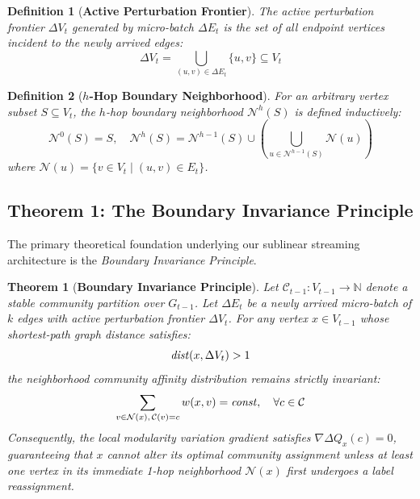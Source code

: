 \documentclass[10pt,journal,compsoc]{IEEEtran}
\newtheorem{theorem}{Theorem}
\newtheorem{definition}{Definition}
\begin{document}
\begin{definition}[\textbf{Active Perturbation Frontier}]
The active perturbation frontier $\Delta V_t$ generated by micro-batch $\Delta E_t$ is the set of all endpoint vertices incident to the newly arrived edges:
\begin{equation}
\Delta V_t = \bigcup_{(u, v) \in \Delta E_t} \{u, v\} \subseteq V_t
\end{equation}
\end{definition}

\begin{definition}[\textbf{$h$-Hop Boundary Neighborhood}]
For an arbitrary vertex subset $S \subseteq V_t$, the $h$-hop boundary neighborhood $\mathcal{N}^h(S)$ is defined inductively:
\begin{equation}
\mathcal{N}^0(S) = S, \quad \mathcal{N}^h(S) = \mathcal{N}^{h-1}(S) \cup \left( \bigcup_{u \in \mathcal{N}^{h-1}(S)} \mathcal{N}(u) \right)
\end{equation}
where $\mathcal{N}(u) = \{v \in V_t \mid (u, v) \in E_t\}$.
\end{definition}

\subsection{Theorem 1: The Boundary Invariance Principle}
The primary theoretical foundation underlying our sublinear streaming architecture is the \textit{Boundary Invariance Principle}.

\begin{theorem}[\textbf{Boundary Invariance Principle}]\label{thm:boundary_invariance}
Let $\mathcal{C}_{t-1}: V_{t-1} \to \mathbb{N}$ denote a stable community partition over $G_{t-1}$. Let $\Delta E_t$ be a newly arrived micro-batch of $k$ edges with active perturbation frontier $\Delta V_t$. For any vertex $x \in V_{t-1}$ whose shortest-path graph distance satisfies:
\begin{equation}
\text{\emph{dist}}(x, \Delta V_t) > 1
\end{equation}
the neighborhood community affinity distribution remains strictly invariant:
\begin{equation}
\sum_{v \in \mathcal{N}(x),\, \mathcal{C}(v) = c} w(x, v) = \text{\emph{const}}, \quad \forall c \in \mathcal{C}
\end{equation}
Consequently, the local modularity variation gradient satisfies $\nabla \Delta Q_x(c) = 0$, guaranteeing that $x$ cannot alter its optimal community assignment unless at least one vertex in its immediate 1-hop neighborhood $\mathcal{N}(x)$ first undergoes a label reassignment.
\end{theorem}
\end{document}
